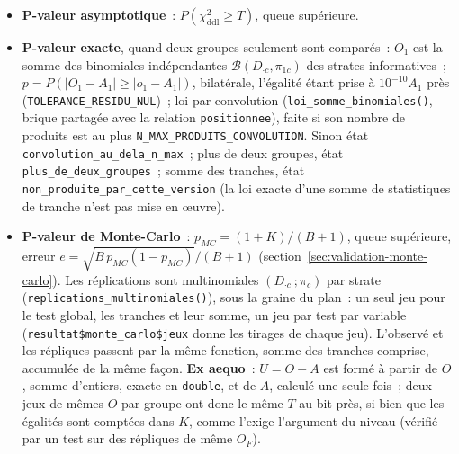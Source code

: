\documentclass[a4paper,11pt]{article}
\newcommand{\code}[1]{\texttt{\small #1}}
\begin{document}
{\begin{itemize}[leftmargin=*, itemsep=2pt]
    \code{resultat\$tests})~: le test global (toutes les cellules de la
    plage)~; un test par tranche d'âge déclarée, $T_b$~; leur somme $T =
    \sum_b T_b$, de degrés de liberté $\sum_b \mathrm{ddl}_b$, test du score
    contre l'alternative «~rapport entre segments constant dans chaque
    tranche, variable d'une tranche à l'autre~», l'information
    conditionnelle étant diagonale par blocs de tranches (décision M290)~;
    et, quand la segmentation a deux variables, un test par variable
    conditionnellement à l'autre (strates~: cellule $\times$ modalité de
    l'autre variable~; groupes~: modalités de la variable testée).
  \item \textbf{P-valeur asymptotique}~: $P(\chi^2_{\mathrm{ddl}} \ge T)$,
    queue supérieure.
  \item \textbf{P-valeur exacte}, quand deux groupes seulement sont
    comparés~: $O_1$ est la somme des binomiales indépendantes
    $\mathcal{B}(D_{\cdot c}, \pi_{1c})$ des strates informatives~; $p =
    P(|O_1 - A_1| \ge |o_1 - A_1|)$, bilatérale, l'égalité étant prise à
    $10^{-10} A_1$ près (\code{TOLERANCE\_RESIDU\_NUL})~; loi par
    convolution (\code{loi\_somme\_binomiales()}, brique partagée avec la
    relation \code{positionnee}), faite si son nombre de produits est au
    plus \code{N\_MAX\_PRODUITS\_CONVOLUTION}. Sinon état
    \code{convolution\_au\_dela\_n\_max}~; plus de deux groupes, état
    \code{plus\_de\_deux\_groupes}~; somme des tranches, état
    \code{non\_produite\_par\_cette\_version} (la loi exacte d'une somme de
    statistiques de tranche n'est pas mise en œuvre).
  \item \textbf{P-valeur de Monte-Carlo}~: $p_{MC} = (1 + K)/(B + 1)$,
    queue supérieure, erreur $e = \sqrt{B\,p_{MC}(1 - p_{MC})}/(B + 1)$
    (section~\ref{sec:validation-monte-carlo}). Les réplications sont
    multinomiales $(D_{\cdot c}~; \pi_c)$ par strate
    (\code{replications\_multinomiales()}), sous la graine du plan~: un seul
    jeu pour le test global, les tranches et leur somme, un jeu par test par
    variable (\code{resultat\$monte\_carlo\$jeux} donne les tirages de
    chaque jeu). L'observé et les répliques passent par la même fonction,
    somme des tranches comprise, accumulée de la même façon. \textbf{Ex
    aequo}~: $U = O - A$ est formé à partir de $O$, somme d'entiers, exacte
    en \code{double}, et de $A$, calculé une seule fois~; deux jeux de mêmes
    $O$ par groupe ont donc le même $T$ au bit près, si bien que les
    égalités sont comptées dans $K$, comme l'exige l'argument du niveau
    (vérifié par un test sur des répliques de même $O_F$).

\end{itemize}}
\end{document}

